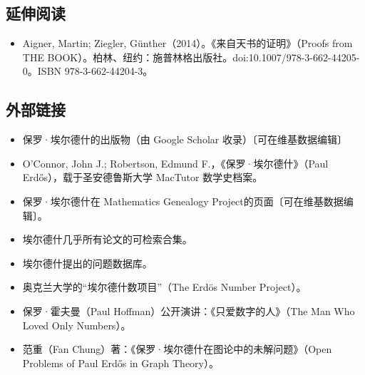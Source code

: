 \subsection{延伸阅读}
\begin{itemize}
\item Aigner, Martin; Ziegler, Günther（2014）。《来自天书的证明》（Proofs from THE BOOK）。柏林、纽约：施普林格出版社。doi:10.1007/978-3-662-44205-0。ISBN 978-3-662-44204-3。
\end{itemize}
\subsection{外部链接}
\begin{itemize}
\item 保罗·埃尔德什的出版物（由 Google Scholar 收录）〔可在维基数据编辑〕
\item O'Connor, John J.; Robertson, Edmund F.，《保罗·埃尔德什》（Paul Erdős），载于圣安德鲁斯大学 MacTutor 数学史档案。
\item 保罗·埃尔德什在 Mathematics Genealogy Project的页面〔可在维基数据编辑〕。
\item 埃尔德什几乎所有论文的可检索合集。
\item 埃尔德什提出的问题数据库。
\item 奥克兰大学的“埃尔德什数项目”（The Erdös Number Project）。
\item 保罗·霍夫曼（Paul Hoffman）公开演讲：《只爱数字的人》（The Man Who Loved Only Numbers）。
\item 范重（Fan Chung）著：《保罗·埃尔德什在图论中的未解问题》（Open Problems of Paul Erdős in Graph Theory）。
\end{itemize}